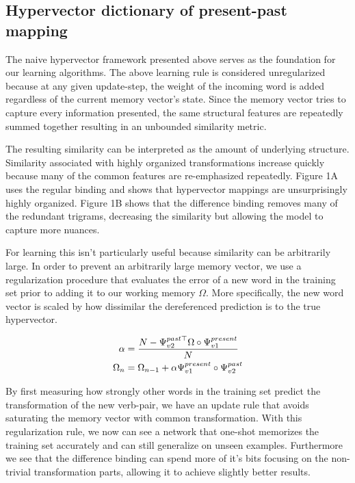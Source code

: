 \documentclass{article}
\begin{document}
\subsection{Hypervector dictionary of present-past mapping}

The naive hypervector framework presented above serves as the foundation for our learning algorithms. The above learning rule is considered unregularized because at any given update-step, the weight of the incoming word is added regardless of the current memory vector's state. Since the memory vector tries to capture every information presented, the same structural features are repeatedly summed together resulting in an unbounded similarity metric.

The resulting similarity can be interpreted as the amount of underlying structure. Similarity associated with highly organized transformations increase quickly because many of the common features are re-emphasized repeatedly. Figure 1A  uses the regular binding and shows that hypervector mappings are unsurprisingly highly organized. Figure 1B shows that the difference binding removes many of the redundant trigrams, decreasing the similarity but allowing the model to capture more nuances.

For learning this isn't particularly useful because similarity can be arbitrarily large. In order to prevent an arbitrarily large memory vector, we use a regularization procedure that evaluates the error of a new word in the training set prior to adding it to our working memory $\Omega$. More specifically, the new word vector is scaled by how dissimilar the dereferenced prediction is to the true hypervector.

\begin{align}
\label{eq:regularization_vec}
\notag \alpha &= \frac{N-\Psi^{past\top}_{v2} \Omega \circ \Psi^{present}_{v1}}{N}  \\
\Omega_n &= \Omega_{n-1} + \alpha \Psi^{present}_{v1} \circ \Psi^{past}_{v2}
\end{align}

By first measuring how strongly other words in the training set predict the transformation of the new verb-pair, we have an update rule that avoids saturating the memory vector with common transformation. With this regularization rule, we now can see a network that one-shot memorizes the training set accurately and can still generalize on unseen examples. Furthermore we see that the difference binding can spend more of it's bits focusing on the non-trivial transformation parts, allowing it to achieve slightly better results.
\end{document}
